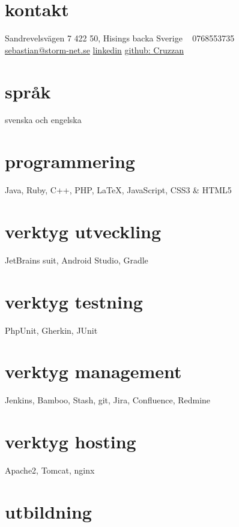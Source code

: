 \documentclass[]{friggeri-cv} %
\begin{document}


\begin{aside} %
\section{kontakt}
Sandrevelsvägen 7
422 50, Hisings backa
Sverige
~
0768553735
~
\href{mailto:sebastian@storm-net.se}{sebastian@storm-net.se}
\href{https://se.linkedin.com/pub/sebastian-hultstrand/60/51a/151}{linkedin}
\href{https://github.com/cruzzan}{github: Cruzzan}
\section{språk}
svenska och engelska
\section{programmering}
Java, Ruby, C++, PHP, LaTeX, JavaScript, CSS3 \& HTML5
\section{verktyg utveckling}
JetBrains suit, Android Studio, Gradle
\section{verktyg testning}
PhpUnit, Gherkin, JUnit
\section{verktyg management}
Jenkins, Bamboo, Stash, git, Jira, Confluence, Redmine
\section{verktyg hosting}
Apache2, Tomcat, nginx
\end{aside}


\section{utbildning}
\end{document}
